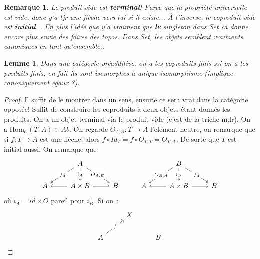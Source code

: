 \documentclass[a4paper,12pt]{book}
\newcommand{\Cat}{\mathcal{C}}
\newcommand{\Hom}{\textrm{Hom}}
\theoremstyle{plain}
\newtheorem{lem}[subsection]{Lemme}
\newtheorem{rem}{Remarque}
\theoremstyle{definition}
\theoremstyle{remark}
\begin{document}
\begin{rem}
    Le produit vide est \textbf{terminal}! Parce que la propriété 
    universelle
    est vide, donc y'a tjr une flèche vers lui si il existe... À 
    l'inverse, le coproduit vide est \textbf{initial}...
    En plus l'idée que y'a vraiment que \textbf{le} singleton dans Set
    ca donne encore plus envie des faires des topos. Dans Set, les
    objets semblent vraiments canoniques en tant qu'ensemble..
\end{rem}

\begin{lem}
    Dans une catégorie préadditive, on a les coproduits finis ssi
    on a les produits finis, en fait ils sont isomorphes à unique
    isomorphisme (implique canoniquement égaux ?).
\end{lem}
\begin{proof}
    Il suffit de le montrer dans un sens, ensuite ce sera vrai dans la
    catégorie opposée! Suffit de construire les coproduits à deux objets
    étant donnés les produits. On a un objet terminal via le produit
    vide (c'est de la triche mdr). On a $\Hom_{\Cat}(T,A)\in Ab$. 
    On regarde $O_{T,A}\colon T\to A$ l'élément neutre, on remarque que
    si $f\colon T\to A$ est une flèche, alors 
    $f\circ Id_T=f\circ O_{T,T}=O_{T,A}$. De sorte que $T$ est initial
    aussi. On remarque que 
\[\begin{tikzcd}
	& A &&& B \\
	A & {A\times B} & B & A & {A\times B} & B
	\arrow["Id"{description}, from=1-2, to=2-1]
	\arrow["{i_A}"{description}, from=1-2, to=2-2]
	\arrow["{O_{A,B}}"{description}, from=1-2, to=2-3]
	\arrow["{O_{B,A}}"{description}, from=1-5, to=2-4]
	\arrow["{i_B}"{description}, from=1-5, to=2-5]
	\arrow["Id"{description}, from=1-5, to=2-6]
	\arrow[from=2-2, to=2-1]
	\arrow[from=2-2, to=2-3]
	\arrow[from=2-5, to=2-4]
	\arrow[from=2-5, to=2-6]
\end{tikzcd}\]
    où $i_A=id\times O$ pareil pour $i_B$. Si on a %
\[\begin{tikzcd}
	& X \\
	A && B
	\arrow["f"{description}, from=2-1, to=1-2]

\end{tikzcd}\]
\end{proof}
\end{document}
